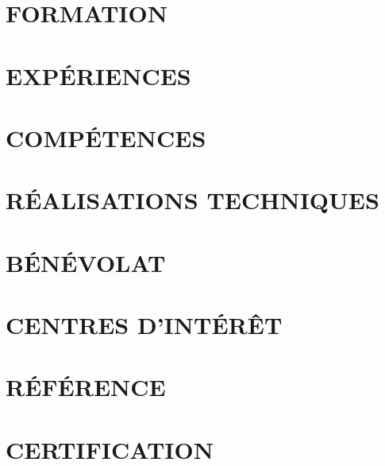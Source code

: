 \documentclass[a4paper,11pt]{article}
\begin{document}
\begin{multicols}{2} 

    \section{FORMATION}
    \vspace{12em}
    
    \section{EXPÉRIENCES}
    \vspace{12em}
    
    \columnbreak
    
    \section{COMPÉTENCES}
    \vspace{12em}
    
    \section{RÉALISATIONS TECHNIQUES}
    \vspace{12em}
    
    \section{BÉNÉVOLAT}
    \vspace{12em}
    
    \end{multicols}

\vspace{8em}

\begin{multicols}{2}
\section{CENTRES D'INTÉRÊT}
\vspace{12em}

\columnbreak

\section{RÉFÉRENCE}
\vspace{12em}
\end{multicols}

\vspace{8em}

\section{CERTIFICATION}
\vspace{12em}
\end{document}
